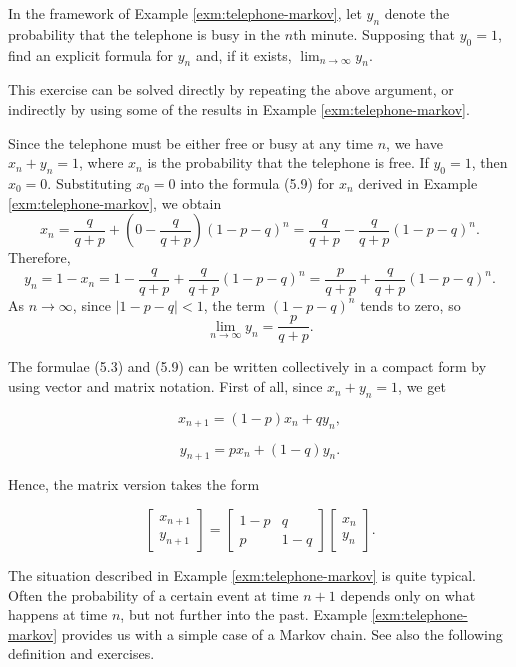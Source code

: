 \begin{Exercise}
\label{exr:telephone-busy}
In the framework of Example \ref{exm:telephone-markov}, let $y_n$ denote the probability that the telephone is busy in the $n$th minute. Supposing that $y_0 = 1$, find an explicit formula for $y_n$ and, if it exists, $\lim_{n\to\infty} y_n$.

\begin{hint}
This exercise can be solved directly by repeating the above argument, or indirectly by using some of the results in Example \ref{exm:telephone-markov}.
\end{hint}
\end{Exercise}

\begin{Solution}
Since the telephone must be either free or busy at any time $n$, we have $x_n + y_n = 1$, where $x_n$ is the probability that the telephone is free. If $y_0 = 1$, then $x_0 = 0$. Substituting $x_0 = 0$ into the formula (5.9) for $x_n$ derived in Example \ref{exm:telephone-markov}, we obtain
\[
x_n = \frac{q}{q+p} + \left(0 - \frac{q}{q+p}\right)(1-p-q)^n = \frac{q}{q+p} - \frac{q}{q+p}(1-p-q)^n.
\]
Therefore,
\[
y_n = 1 - x_n = 1 - \frac{q}{q+p} + \frac{q}{q+p}(1-p-q)^n = \frac{p}{q+p} + \frac{q}{q+p}(1-p-q)^n.
\]
As $n \to \infty$, since $|1-p-q| < 1$, the term $(1-p-q)^n$ tends to zero, so
\[
\lim_{n\to\infty} y_n = \frac{p}{q+p}.
\]
\end{Solution}

\begin{Remark}
\label{rem:vector-matrix-form}
The formulae (5.3) and (5.9) can be written collectively in a compact form by using vector and matrix notation. First of all, since $x_n + y_n = 1$, we get

\begin{equation}
x_{n+1} = (1-p)x_n + q y_n,
\end{equation}

\begin{equation}
y_{n+1} = p x_n + (1-q) y_n.
\end{equation}

Hence, the matrix version takes the form

\begin{equation}
\begin{bmatrix}
x_{n+1} \\
y_{n+1}
\end{bmatrix}
=
\begin{bmatrix}
1-p & q \\
p & 1-q
\end{bmatrix}
\begin{bmatrix}
x_n \\
y_n
\end{bmatrix}.
\end{equation}

The situation described in Example \ref{exm:telephone-markov} is quite typical. Often the probability of a certain event at time $n+1$ depends only on what happens at time $n$, but not further into the past. Example \ref{exm:telephone-markov} provides us with a simple case of a Markov chain. See also the following definition and exercises.
\end{Remark}

